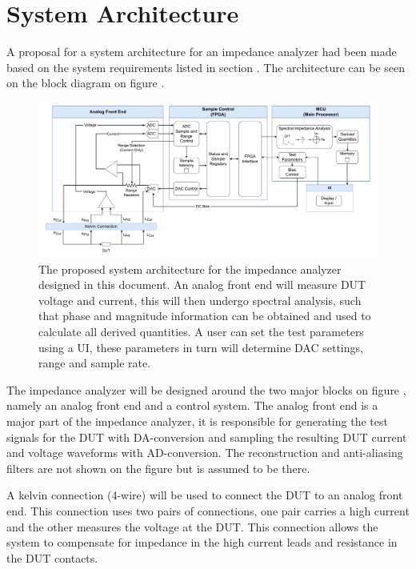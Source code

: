 \chapter{System Architecture} \label{ch:SysArchitecture}

A proposal for a system architecture for an impedance analyzer had been made based on the system requirements listed in section . The architecture can be seen on the block diagram on figure .  

\begin{figure}[H]
    \centering
    \includegraphics[clip, trim=18 0 18 0,width=1.0\textwidth]{Sections/6_SystemArchitecture/Figures/SystemArchitecture.pdf}
    \caption{The proposed system architecture for the impedance analyzer designed in this document. An analog front end will measure DUT voltage and current, 
    this will then undergo spectral analysis, such that phase and magnitude information can be obtained and used to calculate all derived quantities. A user can set the test parameters using a UI, these parameters in turn will determine DAC settings, range and sample rate.}
    \label{fig_6_SysArchitecture}
\end{figure}

The impedance analyzer will be designed around the two major blocks on figure , namely an analog front end and a control system. The analog front end is a major part of the impedance analyzer, it is responsible for generating the test signals for the DUT with DA-conversion and sampling the resulting DUT current and voltage waveforms with AD-conversion. The reconstruction and anti-aliasing filters are not shown on the figure but is assumed to be there.

A kelvin connection (4-wire) will be used to connect the DUT to an analog front end. This connection uses two pairs of connections, one pair carries a high current and the other measures the voltage at the DUT. This connection allows the system to compensate for impedance in the high current leads and resistance in the DUT contacts.

